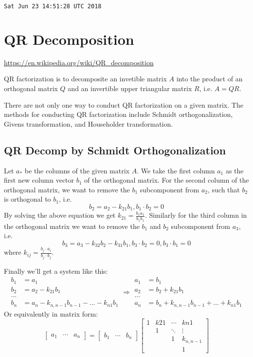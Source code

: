 \verb|Sat Jun 23 14:51:28 UTC 2018|

\section{QR Decomposition}
\url{https://en.wikipedia.org/wiki/QR_decomposition}

QR factorization is to decomposite an invetible matrix $A$ into
the product of an orthogonal matrix $Q$ and an invertible upper
triangular matrix $R$, i.e. $A=QR$.

There are not only one way to conduct QR factorization on a given
matrix. The methods for conducting QR factorization include
Schmidt orthogonalization, Givens transformation, and Householder
transformation.

\subsection{QR Decomp by Schmidt Orthogonalization}

Let $a_\ast$ be the columns of the given matrix $A$. We take the
first column $a_1$ as the first new column vector $b_1$ of the
orthogonal matrix. For the second column of the orthogonal matrix,
we want to remove the $b_1$ subcomponent from $a_2$, such that
$b_2$ is orthogonal to $b_1$, i.e.
$$b_2 = a_2 - k_{21}b_1, b_1\cdot b_2=0$$
By solving the above equation we get $k_{21} = \frac{b_1a_1}{b_1b_1}$.
Similarly for the third column in the orthogonal matrix we want
to remove the $b_1$ and $b_2$ subcomponent from $a_3$, i.e.
$$b_3 = a_3 - k_{32}b_2 - k_{31} b_1, b_3\cdot b_2 = 0, b_3 \cdot b_1 = 0$$
where $k_{ij} = \frac{b_j\cdot a_i}{b_j\cdot b_j}$.

Finally we'll get a system like this:
$$
\begin{aligned}
	b_1 &= a_1 \\
	b_2 &= a_2 - k_{21}b_1 \\
	\ldots \\
	b_n &= a_n - k_{n,n-1}b_{n-1} - \ldots - k_{n1}b_1
\end{aligned}
\Rightarrow
\begin{aligned}
	a_1 &= b_1 \\
	a_2 &= b_2 + k_{21}b_1 \\
	\ldots \\
	a_n &= b_n + k_{n,n-1}b_{n-1} + \ldots + k_{n1}b_1
\end{aligned}
$$
Or equivalently in matrix form:
$$
\begin{bmatrix}
	a_1 & \cdots & a_n
\end{bmatrix}
=
\begin{bmatrix}
	b_1 & \cdots & b_n
\end{bmatrix}
\begin{bmatrix}
	1 & k21 & \cdots & kn1 \\
	  & 1   & \ddots  & \vdots \\
	  &     &  1 & k_{n,n-1} \\
	  & & & 1
\end{bmatrix}
$$

